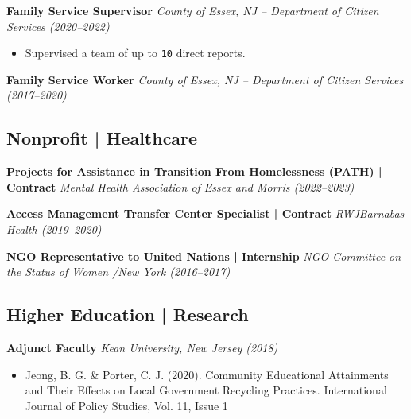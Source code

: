\documentclass[11pt,a4paper]{article} \usepackage[a4paper,margin=1.2cm]{geometry}
\begin{document}
\par\noindent\textbf{Family Service Supervisor}  
\newline\textit{County of Essex, NJ – Department of Citizen Services (2020–2022)}  
\begin{itemize}
  \item Supervised a team of up to \texttt{10} direct reports.
\end{itemize}

\par\noindent\textbf{Family Service Worker}  
\newline\textit{County of Essex, NJ – Department of Citizen Services (2017–2020)}

\subsection*{Nonprofit | Healthcare}

\par\noindent\textbf{Projects for Assistance in Transition From Homelessness (PATH) | Contract}  
\newline\textit{Mental Health Association of Essex and Morris (2022–2023)}

\vspace{0.3em}

\par\noindent\textbf{Access Management Transfer Center Specialist | Contract}  
\newline\textit{RWJBarnabas Health (2019–2020)}

\vspace{0.3em}

\par\noindent\textbf{NGO Representative to United Nations | Internship}  
\newline\textit{NGO Committee on the Status of Women /New York (2016–2017)}


\subsection*{Higher Education | Research}

\textbf{Adjunct Faculty}  
\textit{Kean University, New Jersey (2018)}  
\begin{itemize}[noitemsep, topsep=0pt]
  \item Jeong, B. G. & Porter, C. J. (2020). Community Educational Attainments and Their
      Effects on Local Government Recycling Practices. International Journal of Policy
      Studies, Vol. 11, Issue 1
\end{itemize}
\end{document}

